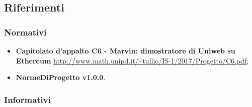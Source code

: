 \subsection{Riferimenti}
\subsubsection{Normativi}
\begin{itemize}
	\item
	\textbf{Capitolato d’appalto C6 - Marvin: dimostratore di Uniweb su Ethereum}
	\url{http://www.math.unipd.it/~tullio/IS-1/2017/Progetto/C6.pdf};
	\item
	\textbf{NormeDiProgetto v1.0.0}. 
\end{itemize}

\subsubsection{Informativi}
